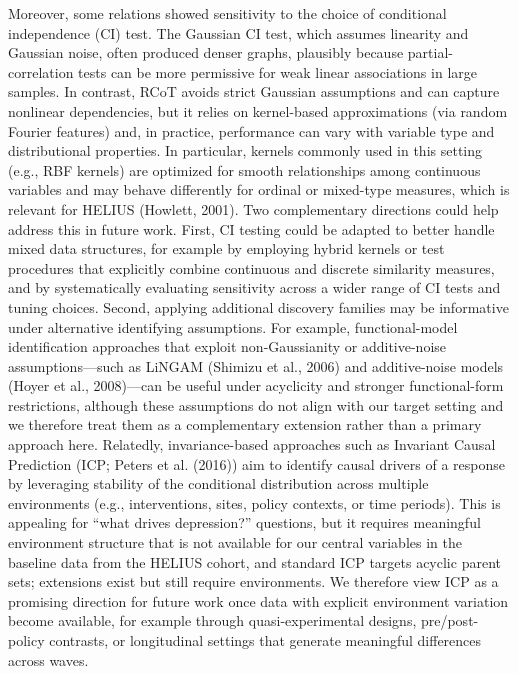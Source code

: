 \documentclass[
]{article}
\begin{document}
Moreover, some relations showed sensitivity to the choice of conditional
independence (CI) test. The Gaussian CI test, which assumes linearity
and Gaussian noise, often produced denser graphs, plausibly because
partial-correlation tests can be more permissive for weak linear
associations in large samples. In contrast, RCoT avoids strict Gaussian
assumptions and can capture nonlinear dependencies, but it relies on
kernel-based approximations (via random Fourier features) and, in
practice, performance can vary with variable type and distributional
properties. In particular, kernels commonly used in this setting (e.g.,
RBF kernels) are optimized for smooth relationships among continuous
variables and may behave differently for ordinal or mixed-type measures,
which is relevant for HELIUS (Howlett, 2001). Two complementary
directions could help address this in future work. First, CI testing
could be adapted to better handle mixed data structures, for example by
employing hybrid kernels or test procedures that explicitly combine
continuous and discrete similarity measures, and by systematically
evaluating sensitivity across a wider range of CI tests and tuning
choices. Second, applying additional discovery families may be
informative under alternative identifying assumptions. For example,
functional-model identification approaches that exploit non-Gaussianity
or additive-noise assumptions---such as LiNGAM (Shimizu et al., 2006)
and additive-noise models (Hoyer et al., 2008)---can be useful under
acyclicity and stronger functional-form restrictions, although these
assumptions do not align with our target setting and we therefore treat
them as a complementary extension rather than a primary approach here.
Relatedly, invariance-based approaches such as Invariant Causal
Prediction (ICP; Peters et al. (2016)) aim to identify causal drivers of
a response by leveraging stability of the conditional distribution
across multiple environments (e.g., interventions, sites, policy
contexts, or time periods). This is appealing for ``what drives
depression?'' questions, but it requires meaningful environment
structure that is not available for our central variables in the
baseline data from the HELIUS cohort, and standard ICP targets acyclic
parent sets; extensions exist but still require environments. We
therefore view ICP as a promising direction for future work once data
with explicit environment variation become available, for example
through quasi-experimental designs, pre/post-policy contrasts, or
longitudinal settings that generate meaningful differences across waves.
\end{document}
